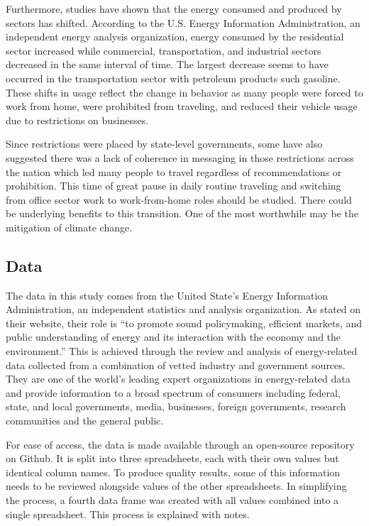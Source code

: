 \documentclass[
]{article}
\begin{document}
Furthermore, studies have shown that the energy consumed and produced by
sectors has shifted. According to the U.S. Energy Information
Administration, an independent energy analysis organization, energy
consumed by the residential sector increased while commercial,
transportation, and industrial sectors decreased in the same interval of
time. The largest decrease seems to have occurred in the transportation
sector with petroleum products such gasoline. These shifts in usage
reflect the change in behavior as many people were forced to work from
home, were prohibited from traveling, and reduced their vehicle usage
due to restrictions on businesses.

Since restrictions were placed by state-level governments, some have
also suggested there was a lack of coherence in messaging in those
restrictions across the nation which led many people to travel
regardless of recommendations or prohibition. This time of great pause
in daily routine traveling and switching from office sector work to
work-from-home roles should be studied. There could be underlying
benefits to this transition. One of the most worthwhile may be the
mitigation of climate change.

\hypertarget{data}{%
\subsection{Data}\label{data}}

The data in this study comes from the United State's Energy Information
Administration, an independent statistics and analysis organization. As
stated on their website, their role is ``to promote sound policymaking,
efficient markets, and public understanding of energy and its
interaction with the economy and the environment.'' This is achieved
through the review and analysis of energy-related data collected from a
combination of vetted industry and government sources. They are one of
the world's leading expert organizations in energy-related data and
provide information to a broad spectrum of consumers including federal,
state, and local governments, media, businesses, foreign governments,
research communities and the general public.

For ease of access, the data is made available through an open-source
repository on Github. It is split into three spreadsheets, each with
their own values but identical column names. To produce quality results,
some of this information needs to be reviewed alongside values of the
other spreadsheets. In simplifying the process, a fourth data frame was
created with all values combined into a single spreadsheet. This process
is explained with notes.
\end{document}
